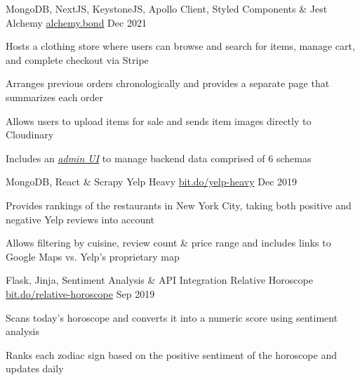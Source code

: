 

\begin{cventries}

  \cventry
  {MongoDB, NextJS, KeystoneJS, Apollo Client, Styled Components \& Jest} %
  {Alchemy} %
  {\href{https://alchemy.bond/}{alchemy.bond}} %
  {Dec 2021} %
  {
    \begin{cvitems} %
      \item {Hosts a clothing store where users can browse and search for items, manage cart, and complete checkout via Stripe}
      \item {Arranges previous orders chronologically and provides a separate page that summarizes each order}
      \item {Allows users to upload items for sale and sends item images directly to Cloudinary}
      \item {Includes an \href{https://api.alchemy.bond/}{\emph{admin UI}} to manage backend data comprised of 6 schemas}
    \end{cvitems}
  }

  \cventry
  {MongoDB, React \& Scrapy} %
  {Yelp Heavy} %
  {\href{https://yelp-heavy.herokuapp.com/}{bit.do/yelp-heavy}} %
  {Dec 2019} %
  {
    \begin{cvitems} %
      \item {Provides rankings of the restaurants in New York City, taking both positive and negative Yelp reviews into account}
      \item {Allows filtering by cuisine, review count \& price range and includes links to Google Maps vs. Yelp's proprietary map}
    \end{cvitems}
  }

  \cventry
  {Flask, Jinja, Sentiment Analysis \& API Integration} %
  {Relative Horoscope} %
  {\href{https://relative-horoscope.herokuapp.com/}{bit.do/relative-horoscope}} %
  {Sep 2019} %
  {
    \begin{cvitems} %
      \item {Scans today's horoscope and converts it into a numeric score using sentiment analysis}
      \item {Ranks each zodiac sign based on the positive sentiment of the horoscope and updates daily}
    \end{cvitems}
  }

\end{cventries}